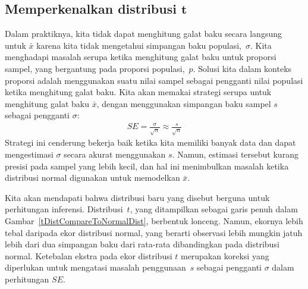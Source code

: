 


\subsection[Memperkenalkan distribusi $t$]
    {Memperkenalkan distribusi $\pmb{t}$}
\label{introducingTheTDistribution}


Dalam praktiknya, kita tidak dapat menghitung galat baku secara langsung
untuk $\bar{x}$ karena kita tidak mengetahui simpangan baku
populasi,~$\sigma$.
Kita menghadapi masalah serupa ketika menghitung galat
baku untuk proporsi sampel, yang bergantung pada proporsi
populasi,~$p$.
Solusi kita dalam konteks proporsi adalah menggunakan suatu nilai
sampel sebagai pengganti
nilai populasi ketika menghitung galat baku.
Kita akan memakai strategi serupa untuk menghitung galat
baku $\bar{x}$, dengan menggunakan simpangan
baku sampel $s$ sebagai pengganti $\sigma$:
\begin{align*}
SE = \frac{\sigma}{\sqrt{n}} \approx \frac{s}{\sqrt{n}}
\end{align*}
Strategi ini cenderung bekerja baik ketika kita memiliki
banyak data dan dapat mengestimasi $\sigma$ secara akurat menggunakan $s$.
Namun, estimasi tersebut kurang presisi pada sampel yang lebih kecil,
dan hal ini menimbulkan masalah ketika distribusi
normal digunakan untuk memodelkan $\bar{x}$.

Kita akan mendapati bahwa distribusi baru yang disebut
 berguna
untuk perhitungan inferensi.
Distribusi~$t$, yang ditampilkan sebagai garis penuh dalam
Gambar~\ref{tDistCompareToNormalDist}, berbentuk lonceng.
Namun, ekornya lebih tebal daripada ekor distribusi normal,
yang berarti observasi lebih mungkin jatuh lebih dari dua
simpangan baku dari rata-rata dibandingkan pada distribusi
normal. %
Ketebalan ekstra pada ekor distribusi $t$ merupakan
koreksi yang diperlukan untuk mengatasi masalah penggunaan~$s$
sebagai pengganti $\sigma$ dalam perhitungan $SE$.

